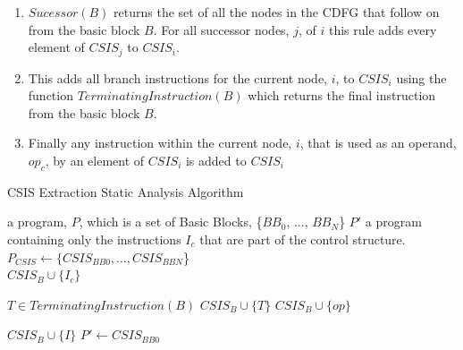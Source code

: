 \begin{enumerate}
    \setlength{\itemsep}{3pt}
    \setlength{\parskip}{0pt}
    \setlength{\parsep}{0pt}
    \item $Sucessor(B)$ returns the set of all the nodes in the CDFG that follow on from the basic block $B$.
	  For all successor nodes, $j$, of $i$ this rule adds every element of $CSIS_j$ to $CSIS_i$.
    \item This adds all branch instructions for the current node, $i$, to $CSIS_i$ using the function
	  $TerminatingInstruction(B)$ which returns the final instruction from the basic block $B$.
    \item Finally any instruction within the current node, $i$, that is used as an operand, $op_{c}$, by an element of $CSIS_i$ is added to $CSIS_i$
\end{enumerate}
\vspace{-4pt}

\begin{algorithm}[t]
\caption{CSIS Extraction Static Analysis Algorithm
\label{alg:CSIS-extraction}}
    \begin{algorithmic}[1]
        \INPUT a program, $P$, which is a set of Basic Blocks, \{$BB_0$, ..., $BB_N$\}
        \OUTPUT $P'$ a program containing only the instructions $I_c$ that are part of the control structure.
        \Statex
            \State $P_{CSIS} \gets \{CSIS_{BB0}, \dots,  CSIS_{BBN}$\}
                \\\hrulefill
                        \State $CSIS_B \cup \{I_{c}\}$
                    \EndFor
                \EndFor
                \\\hrulefill

                \State $T \in TerminatingInstruction(B)$
                \State $CSIS_{B} \cup \{T\}$
                    \State $CSIS_{B} \cup \{op\}$
                \EndFor
                \\\hrulefill

                                \State $CSIS_{B} \cup \{I\}$
                            \EndIf
                        \EndFor
                    \EndFor
                \EndFor
            \EndFor
	\State $P' \gets CSIS_{BB0}$
        \EndWhile
    \end{algorithmic}
\end{algorithm}

